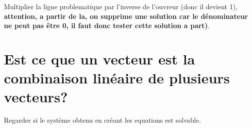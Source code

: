\documentclass{article}
\begin{document}
Multiplier la ligne problematique par l'inverse de l'ouvreur (donc il devient 1), \textbf{attention, a partir de la, on supprime une solution car le dénominateur ne peut pas être 0, il faut donc tester cette solution a part)}.

\section{Est ce que un vecteur est la combinaison linéaire de plusieurs vecteurs?}
Regarder si le système obtenu en créant les equations est solvable.
\end{document}
